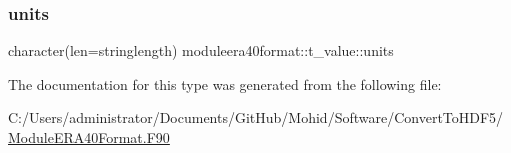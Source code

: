 \mbox{\label{structmoduleera40format_1_1t__value_a41e74305100780d5f75f70e0ae1fe750}} 
\subsubsection{\texorpdfstring{units}{units}}
{\footnotesize\ttfamily character(len=stringlength) moduleera40format\+::t\+\_\+value\+::units\hspace{0.3cm}{\ttfamily [private]}}



The documentation for this type was generated from the following file\+:\begin{DoxyCompactItemize}
\item 
C\+:/\+Users/administrator/\+Documents/\+Git\+Hub/\+Mohid/\+Software/\+Convert\+To\+H\+D\+F5/\mbox{\hyperlink{_module_e_r_a40_format_8_f90}{Module\+E\+R\+A40\+Format.\+F90}}\end{DoxyCompactItemize}
